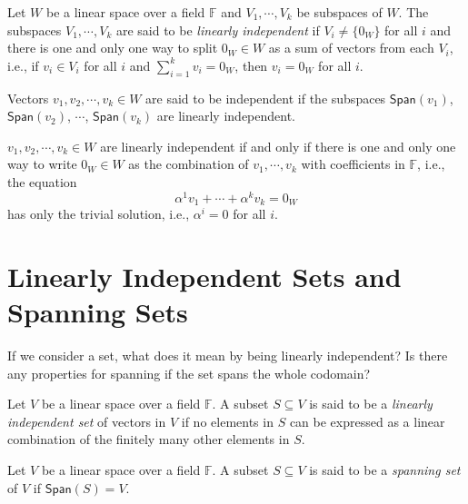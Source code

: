 \documentclass[
	11pt, %
	fleqn, %
	a4paper, %
]{LegrandOrangeBook}
\renewcommand{\span}[1]{\mathsf{Span}(#1)} %
\newcommand{\F}{\mathbb{F}} %
\begin{document}
\begin{definition} \label{def:linear_independence}
    Let $W$ be a linear space over a field $\F$ and $V_1, \cdots, V_k$ be subspaces of $W$. The subspaces $V_1, \cdots, V_k$ are said to be \emph{linearly independent} if $V_i \neq \{0_W\}$ for all $i$ and there is one and only one way to split $0_W \in W$ as a sum of vectors from each $V_i$, i.e., if $v_i \in V_i$ for all $i$ and $\sum_{i=1}^{k} v_i = 0_W$, then $v_i = 0_W$ for all $i$.
\end{definition}

Vectors $v_1, v_2, \cdots, v_k \in W$ are said to be independent if the subspaces $\span{v_1}$, $\span{v_2}$, $\cdots$, $\span{v_k}$ are linearly independent.

\begin{proposition}
    $v_1, v_2, \cdots, v_k \in W$ are linearly independent if and only if there is one and only one way to write $0_W \in W$ as the combination of $v_1, \cdots, v_k$ with coefficients in $\F$, i.e., the equation 
    \[
        \alpha^1 v_1 + \cdots + \alpha^k v_k = 0_W
    \]
    has only  the trivial solution, i.e., $\alpha^i = 0$ for all $i$.
\end{proposition}

\newpage

\section{Linearly Independent Sets and Spanning Sets}

If we consider a set, what does it mean by being linearly independent? Is there any properties for spanning if the set spans the whole codomain?

\begin{definition}
    Let $V$ be a linear space over a field $\F$. A subset $S \subseteq V$ is said to be a \emph{linearly independent set} of vectors in $V$ if no elements in $S$ can be expressed as a linear combination of the finitely many other elements in $S$.
\end{definition}

\begin{definition}
    Let $V$ be a linear space over a field $\F$. A subset $S \subseteq V$ is said to be a \emph{spanning set} of $V$ if $\span{S} = V$.
\end{definition}
\end{document}
